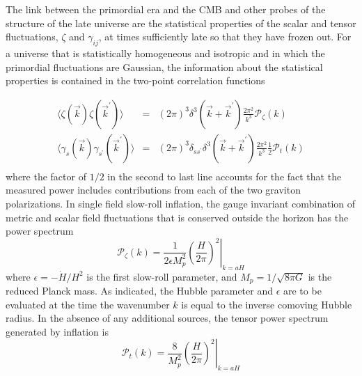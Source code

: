The link between the primordial era and the CMB and other probes of the structure of the late universe are the statistical properties of the scalar and tensor fluctuations, $\zeta$ and $\gamma_{ij}$, at times sufficiently late so that they have frozen out. For a universe that is statistically homogeneous and isotropic and in which the primordial fluctuations are Gaussian, the information about the statistical properties is contained in the two-point correlation functions


\begin{eqnarray}
\langle\zeta(\vec{k})\zeta(\vec{k}^{\prime})\rangle&=&(2\pi)^3\delta^3(\vec{k}+\vec{k}^{\prime})\frac{2\pi^2}{k^3}\mathcal{P}_{\zeta}(k)\nonumber\\
\langle\gamma_s(\vec{k})\gamma_{s^{\prime}}(\vec{k}^{\prime})\rangle&=&(2\pi)^3\delta_{ss^{\prime}}\delta^3(\vec{k}+\vec{k}^{\prime})\frac{2\pi^2}{k^3}\frac{1}{2}\mathcal{P}_{t}(k)\nonumber\\
\end{eqnarray}
where the factor of $1/2$ in the second to last line accounts for the fact that the measured power includes contributions from each of the two graviton polarizations. In single field slow-roll inflation, the gauge invariant combination of metric and scalar field fluctuations that is conserved outside the horizon has the power spectrum
\begin{equation}
\label{eq:inf_Pzeta}
\mathcal{P}_{\zeta}(k)=\frac{1}{2\epsilon M_p^2}\left.\left(\frac{H}{2\pi}\right)^2\right|_{k=aH}
\end{equation}
where $\epsilon=-\dot{H}/H^2$ is the first slow-roll parameter, and $M_p=1/\sqrt{8\pi G}$ is the reduced Planck mass. As indicated, the Hubble parameter and $\epsilon$ are to be evaluated at the time the wavenumber $k$ is equal to the inverse comoving Hubble radius. In the absence of any additional sources, the tensor power spectrum generated by inflation is
\begin{equation}
\label{eq:inf_Pt}
\mathcal{P}_{t}(k)=\frac{8}{M_p^2}\left.\left(\frac{H}{2\pi}\right)^2\right|_{k=aH}
\end{equation}


